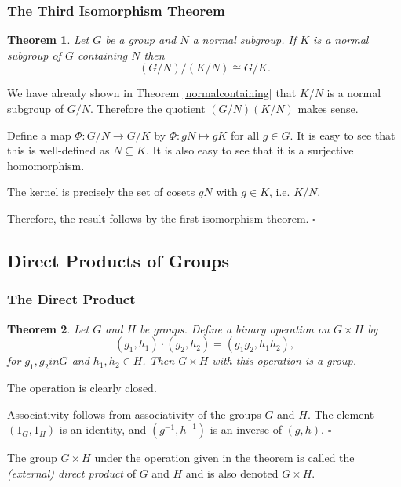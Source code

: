 \documentclass[10pt]{article}
\newtheorem{theorem}{Theorem}[section]
\newenvironment{proof}[1][Proof]{\begin{trivlist}
\item[\hskip \labelsep {\itshape #1}]}{\end{trivlist}}
\newenvironment{definition}[1][Definition]{\begin{trivlist}
\item[\hskip \labelsep {\bfseries #1}]}{\end{trivlist}}
\begin{document}
\subsubsection{The Third Isomorphism Theorem}

\begin{theorem}
Let $G$ be a group and $N$ a normal subgroup. If $K$ is a normal subgroup of $G$ containing $N$ then
$$(G/N)/(K/N) \cong G/K.$$
\end{theorem}

\begin{proof}
We have already shown in Theorem \ref{normalcontaining} that $K/N$ is a normal subgroup of $G/N$. Therefore the quotient $(G/N)(K/N)$ makes sense.

Define a map $\Phi : G/N \to G/K$ by $\Phi : gN \mapsto gK$ for all $g \in G$. It is easy to see that this is well-defined as $N \subseteq K$. It is also easy to see that it is a surjective homomorphism.

The kernel is precisely the set of cosets $gN$ with $g \in K$, i.e. $K/N$. 

Therefore, the result follows by the first isomorphism theorem. $\square$
\end{proof}

\subsection{Direct Products of Groups}

\subsubsection{The Direct Product}

\begin{theorem}
Let $G$ and $H$ be groups. Define a binary operation on $G\times H$ by
$$(g_1, h_1)\cdot (g_2, h_2) = (g_1g_2, h_1h_2),$$
for $g_1, g_2 in G$ and $h_1, h_2 \in H$.
Then $G\times H$ with this operation is a group.
\end{theorem}

\begin{proof}
The operation is clearly closed.

Associativity follows from associativity of the groups $G$ and $H$. The element $(1_G, 1_H)$ is an identity, and $(g^{-1}, h^{-1})$ is an inverse of $(g, h)$. $\square$
\end{proof}

\begin{definition}
The group $G\times H$ under the operation given in the theorem is called the \emph{(external) direct product} of $G$ and $H$ and is also denoted $G\times H$.
\end{definition}
\end{document}
